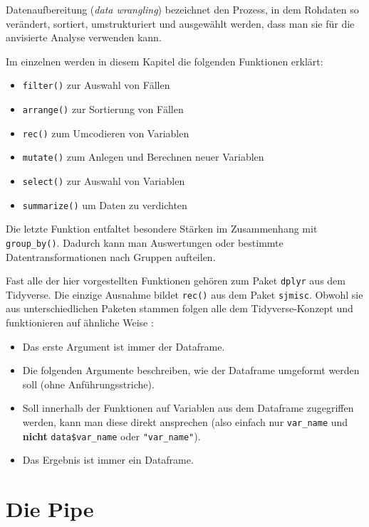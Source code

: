 \documentclass[
]{book}
\begin{document}
Datenaufbereitung (\emph{data wrangling}) bezeichnet den Prozess, in dem Rohdaten so verändert, sortiert, umstrukturiert und ausgewählt werden, dass man sie für die anvisierte Analyse verwenden kann.

Im einzelnen werden in diesem Kapitel die folgenden Funktionen erklärt:

\begin{itemize}
\item
  \texttt{filter()} zur Auswahl von Fällen
\item
  \texttt{arrange()} zur Sortierung von Fällen
\item
  \texttt{rec()} zum Umcodieren von Variablen
\item
  \texttt{mutate()} zum Anlegen und Berechnen neuer Variablen
\item
  \texttt{select()} zur Auswahl von Variablen
\item
  \texttt{summarize()} um Daten zu verdichten
\end{itemize}

Die letzte Funktion entfaltet besondere Stärken im Zusammenhang mit \texttt{group\_by()}. Dadurch kann man Auswertungen oder bestimmte Datentransformationen nach Gruppen aufteilen.

Fast alle der hier vorgestellten Funktionen gehören zum Paket \texttt{dplyr} aus dem Tidyverse. Die einzige Ausnahme bildet \texttt{rec()} aus dem Paket \texttt{sjmisc}. Obwohl sie aus unterschiedlichen Paketen stammen folgen alle dem Tidyverse-Konzept und funktionieren auf ähnliche Weise \citep[vgl.][Kap. 5.1.3]{Wickham_2017}:

\begin{itemize}
\item
  Das erste Argument ist immer der Dataframe.
\item
  Die folgenden Argumente beschreiben, wie der Dataframe umgeformt werden soll (ohne Anführungsstriche).
\item
  Soll innerhalb der Funktionen auf Variablen aus dem Dataframe zugegriffen werden, kann man diese direkt ansprechen (also einfach nur \texttt{var\_name} und \textbf{nicht} \texttt{data\$var\_name} oder \texttt{"var\_name"}).
\item
  Das Ergebnis ist immer ein Dataframe.
\end{itemize}

\hypertarget{die-pipe}{%
\section{Die Pipe}\label{die-pipe}}
\end{document}
